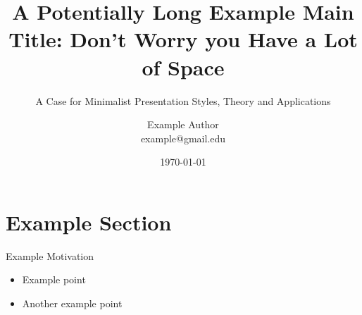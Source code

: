 \documentclass[professionalfont]{beamer}
\title[]{A Potentially Long Example Main Title: Don't Worry you Have a Lot of Space}
\subtitle[]{{\small A Case for Minimalist Presentation Styles, Theory and Applications}}
\author[Author]{Example Author\texorpdfstring{\\}{, }example@gmail.edu}
\institute[]{Example University}
\date{\today}
\begin{document}
\begin{frame}[plain]
\maketitle
\end{frame}

\section{Example Section}

\begin{frame}[fragile]{Example Motivation}
	\begin{itemize}
	\setlength\itemsep{2em}
	\item Example point
	\item \alert{Another} example point
	\end{itemize}
\end{frame}
\end{document}
